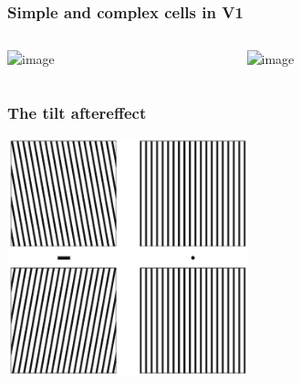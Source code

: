 \documentclass[]{beamer}
\begin{document}
\begin{frame}
 \frametitle{Simple and complex cells in V1}
\begin{overlayarea}{110mm}{70mm}
\begin{columns}[T]
 \begin{column}{55mm}
\begin{center}
\includegraphics<1->[width=50mm]{figs/l3/odd_even_simple_cells.png}
\end{center}
 \end{column}

 \begin{column}{55mm}
\begin{center}
\includegraphics<2->[width=50mm]{figs/l3/complex_cell_response.png}
\end{center}
 \end{column}
\end{columns}

\end{overlayarea}
\end{frame}


\begin{frame}
 \frametitle{The tilt aftereffect}
\begin{center}
\includegraphics[width=70mm]{figs/l3/ori_tilt_aftereffect.png}
\end{center}
\end{frame}
\end{document}
